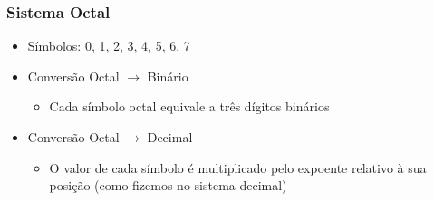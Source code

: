 \documentclass[aspectratio=169,
				xcolor=table]{beamer}
\begin{document}
		\begin{frame}
			\frametitle{Sistema Octal}		
			\begin{itemize}
				\item Símbolos: 0, 1, 2, 3, 4, 5, 6, 7
				\vspace{1cm}
				\item Conversão Octal $\to$ Binário
				\begin{itemize}
					\item Cada \alert{símbolo octal} equivale a \alert{três dígitos binários}\\
				\end{itemize}
				\vspace{1cm}
			
				\item Conversão Octal $\to$ Decimal
				\begin{itemize}
					\item O valor de cada símbolo é multiplicado pelo expoente relativo à sua posição (como fizemos no sistema decimal)
				\end{itemize}
			\end{itemize}
		\end{frame}
	
\end{document}
